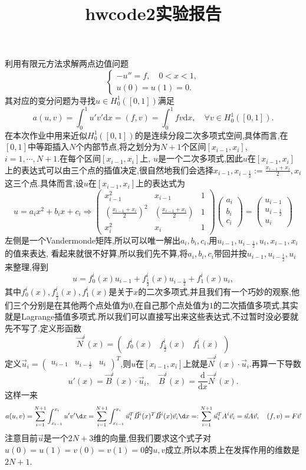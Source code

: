 \documentclass{article}
\title{hwcode2实验报告}
\date{}
\begin{document}
\maketitle

利用有限元方法求解两点边值问题
\[
\begin{cases}
-u'' = f, \quad 0 < x < 1,\\
u(0) = u(1) = 0.
\end{cases}
\]
其对应的变分问题为寻找$ u\in H_0^1([0,1]) $满足
\[a(u,v)=\int_0^1u'v'\mathrm{d} x=(f,v)=\int_0^1fv\mathrm{d} x,\quad \forall v\in H_0^1([0,1]).\]
在本次作业中用来近似$ H_0^1([0,1]) $的是连续分段二次多项式空间,具体而言,在$ [0,1] $中等距插入$ N $个内部节点,将之划分为$ N+1 $个区间$ [x_{i-1},x_{i}] $, $ i=1,\cdots,N+1 $.在每个区间$ [x_{i-1},x_{i}] $上, $ u $是一个二次多项式,因此$ u $在$ [x_{i-1},x_{i}] $上的表达式可以由三个点的插值决定,很自然地我们会选择$ x_{i-1},x_{i-\frac{1}{2}}:=\frac{x_{i-1}+x_i}{2},x_i $这三个点.具体而言,设$ u $在$ [x_{i-1},x_{i}] $上的表达式为
\[u=a_ix^2+b_ix+c_i\Longrightarrow \begin{pmatrix}x_{i-1}^2&x_{i-1}&1\\\left(\frac{x_{i-1}+x_i}{2}\right)^2&\left(\frac{x_{i-1}+x_i}{2}\right)&1\\x_i^2&x_i&1\end{pmatrix}\begin{pmatrix}a_i\\b_i\\c_i\end{pmatrix}=\begin{pmatrix}u_{i-1}\\u_{i-\frac{1}{2}}\\u_i\end{pmatrix}\]
左侧是一个Vandermonde矩阵,所以可以唯一解出$ a_i,b_i,c_i $,用$ u_{i-1},u_{i-\frac{1}{2}},u_i,x_{i-1},x_i $的值来表达,
看起来就很不好算,所以我们先不算,将$ a_i,b_i,c_i $带回并按$ u_{i-1},u_{i-\frac{1}{2}},u_i $来整理,得到
\[u=f^i_0(x)u_{i-1}+f^i_{\frac{1}{2}}(x)u_{i-\frac{1}{2}}+f^i_{1}(x)u_i,\]
其中$ f^i_0(x),f^i_{\frac{1}{2}}(x),f^i_{1}(x) $是关于$ x $的二次多项式,并且我们有一个巧妙的观察,他们三个分别是在其他两个点处值为$ 0 $,在自己那个点处值为$ 1 $的二次插值多项式,其实就是Lagrange插值多项式.所以我们可以直接写出来这些表达式,不过暂时没必要就先不写了.定义形函数
\[\vec{N}^i(x)=\begin{pmatrix}f_0^i(x)&f_{\frac{1}{2}}^i(x)&f_1^i(x)\end{pmatrix}\]
定义$ \vec{u}_i=\begin{pmatrix}u_{i-1}&u_{i-\frac{1}{2}}&u_{i}\end{pmatrix}^T $,则$ u $在$ [x_{i-1},x_i] $上就是$ \vec{N}^i(x)\cdot \vec{u}_i $.再算一下导数
\[u'(x)=\vec{B}^i(x)\cdot \vec{u}_i,\quad \vec{B}^i(x)=\frac{\mathrm{d}}{\mathrm{d}x}\vec{N}^i(x).\]
这样一来
\[a(u,v)=\sum_{i=1}^{N+1}\int_{x_{i-1}}^{x_i}u'v'\d x=\sum_{i=1}^{N+1}\int_{x_{i-1}}^{x_i}\vec{u}_i^T\vec{B}^i(x)^T\vec{B}^i(x)\vec{v}_i\d x=:\sum_{i=1}^{N+1}\vec{u}_i^TA^i\vec{v}_i=\vec{u}A\vec{v},\quad (f,v)=F\vec{v}\]
注意目前$ \vec{u} $是一个$ 2N+3 $维的向量,但我们要求这个式子对$ u(0)=u(1)=v(0)=v(1)=0 $的$ u,v $成立,所以本质上在发挥作用的维数是$ 2N+1 $.
\end{document}
